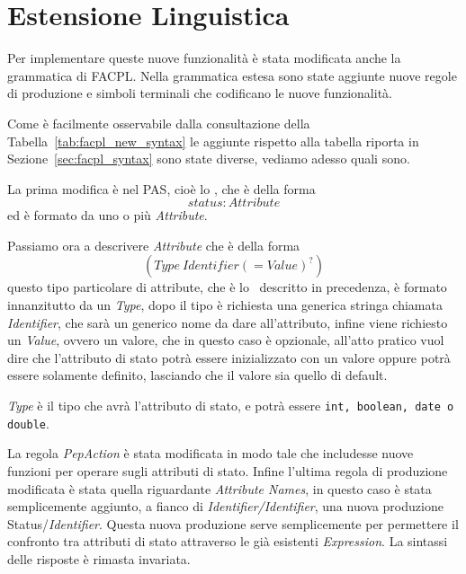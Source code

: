\section{Estensione Linguistica} %
\label{sec:estensione_linguistica}
Per implementare queste nuove funzionalità è stata modificata anche la grammatica di \ac{FACPL}.
Nella grammatica estesa sono state aggiunte nuove regole di produzione e simboli terminali che 
codificano le nuove funzionalità.\\ \par

Come è facilmente osservabile dalla consultazione della Tabella~\ref{tab:facpl_new_syntax} le aggiunte rispetto alla tabella riporta in Sezione~\ref{sec:facpl_syntax} sono state diverse, vediamo adesso quali sono.\\ \par
La prima modifica è nel \ac{PAS}, cioè  lo \status, che è della forma $$status: Attribute$$ ed è formato da uno o più \textit{Attribute}.\\ \par
Passiamo ora a descrivere \textit{Attribute} che è della forma $$(Type\ Identifier (= Value)^?)$$
questo tipo particolare di attribute, che è lo \statusattribute \ descritto in precedenza, è formato innanzitutto da un \textit{Type}, dopo il tipo è richiesta una generica stringa chiamata \textit{Identifier}, che sarà un generico nome da dare all'attributo, infine viene richiesto un \textit{Value}, ovvero un valore, che in questo caso è opzionale, all'atto pratico vuol dire che l'attributo di stato potrà essere inizializzato con un valore oppure potrà essere solamente definito, lasciando che il valore sia quello di default.

\textit{Type} è il tipo che avrà l'attributo di stato, e potrà essere \texttt{int, boolean, date o double}.\\ \par
La regola \textit{PepAction} è stata modificata in modo tale che includesse nuove funzioni per operare sugli attributi di stato.
Infine l'ultima regola di produzione modificata è stata quella riguardante \textit{Attribute Names}, in questo caso è stata semplicemente aggiunto, a fianco di \textit{Identifier/Identifier}, una nuova produzione Status/\textit{Identifier}. Questa nuova produzione serve semplicemente per permettere il confronto tra attributi di stato attraverso le già esistenti \textit{Expression}.
La sintassi delle risposte è rimasta invariata.


